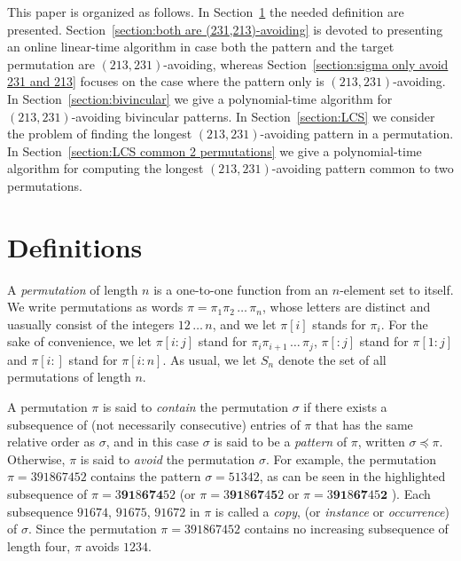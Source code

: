 \documentclass[a4paper]{llncs}
\DeclareMathOperator{\RED}{red}
\begin{document}
	This paper is organized as follows.
	In Section~\ref{section:Definitions} the needed definition are presented.
	Section~\ref{section:both are (231,213)-avoiding} is devoted to presenting
	an online linear-time algorithm in case both the pattern and the target
	permutation are $(213,231)$-avoiding,
	whereas Section~\ref{section:sigma only avoid 231 and 213} focuses on the case
	where the pattern only is $(213,231)$-avoiding.
	In Section~\ref{section:bivincular} we give a polynomial-time algorithm
	for $(213,231)$-avoiding bivincular patterns.
	In Section~\ref{section:LCS} we consider the problem of finding the longest
	$(213,231)$-avoiding pattern in a permutation.
	In Section~\ref{section:LCS common 2 permutations} we give a
	polynomial-time algorithm for computing the longest
	$(213,231)$-avoiding pattern common to two permutations.


\section{Definitions}
\label{section:Definitions}

A \emph{permutation} of length $n$ is a one-to-one function from an
$n$-element set to itself.
We write permutations as words
$\pi = \pi_1\pi_2\,\ldots\,\pi_n$, whose letters are distinct
and uasually consist of the integers $12\,\ldots\,n$, and we let
$\pi[i]$ stands for $\pi_i$.
For the sake of convenience, we let
$\pi[i:j]$ stand for
$\pi_i\pi_{i+1}\,\ldots\,\pi_j$,
$\pi[:j]$ stand for $\pi[1:j]$ and
$\pi[i:]$ stand for $\pi[i:n]$.
As usual, we let $S_n$ denote the set of all permutations of length $n$.


A permutation $\pi$ is said to \emph{contain} the permutation $\sigma$
if there exists a subsequence of (not necessarily consecutive)
entries of $\pi$ that has the same relative order as $\sigma$,
and in this case $\sigma$ is said to be a \emph{pattern} of
$\pi$, written $\sigma \preceq \pi$.
Otherwise, $\pi$ is said to \emph{avoid} the permutation $\sigma$.
For example, the permutation $\pi = 391867452$
contains the pattern $\sigma = 51342$,
as can be seen in the highlighted subsequence of
$\pi = 3\mathbf{9}\mathbf{1}8\mathbf{6}\mathbf{7}\mathbf{4}52$
(or
$\pi = 3\mathbf{9}\mathbf{1}8\mathbf{6}\mathbf{7}4\mathbf{5}2$
or
$\pi = 3\mathbf{9}\mathbf{1}8\mathbf{6}\mathbf{7}45\mathbf{2}$
).
Each subsequence $91674$,
$91675$,
$91672$ in $\pi$ is called a
\emph{copy},
(or \emph{instance} or \emph{occurrence}) of $\sigma$.
Since the permutation $\pi = 391867452$  contains no increasing subsequence of
length four, $\pi$ avoids $1234$.
\end{document}
